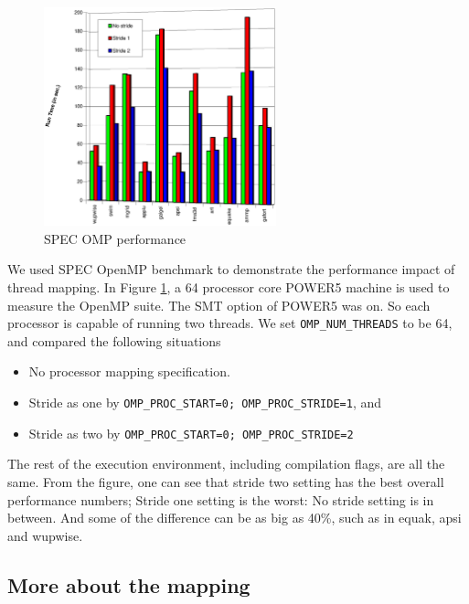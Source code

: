 \begin{figure}[h!]
  \begin{center}
    \includegraphics[angle=0, width=0.60\textwidth]{specomp.eps}
    \caption{\footnotesize SPEC OMP performance}
    \label{fig:specomp}
  \end{center}
\end{figure}

We used SPEC OpenMP benchmark to demonstrate the performance impact of thread
mapping. In Figure \ref{fig:specomp}, a 64 processor core POWER5 machine is used to
measure the OpenMP suite. The SMT option of POWER5 was on. So each processor is
capable of running two threads.  We set \texttt{OMP\_NUM\_THREADS} to be 64,
and compared the following situations

\begin{itemize}
    
  \item No processor mapping specification.

  \item Stride as one by \texttt{OMP\_PROC\_START=0; OMP\_PROC\_STRIDE=1}, and

  \item Stride as two by \texttt{OMP\_PROC\_START=0; OMP\_PROC\_STRIDE=2}

\end{itemize}

The rest of the execution environment, including compilation flags, are all the
same. From the figure, one can see that stride two setting has the best overall
performance numbers; Stride one setting is the worst: No stride setting is in
between.  And some of the difference can be as big as 40\%, such as in
equak, apsi and wupwise.


\subsection{More about the mapping}

